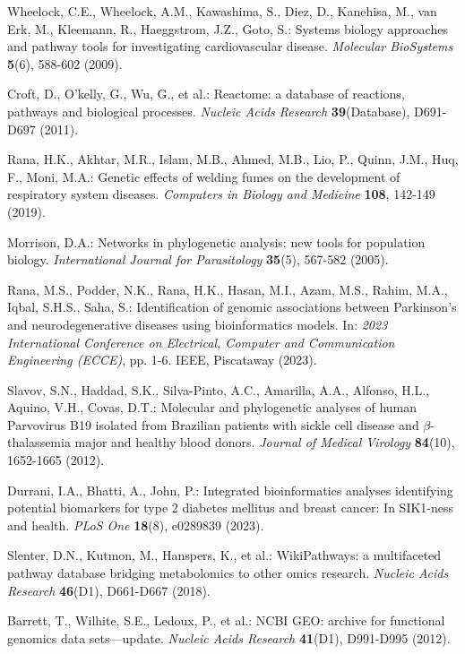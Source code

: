 \documentclass[a4paper,12pt,openbib,oneside]{memoir}
\theoremstyle{plain}
\theoremstyle{plain}
\theoremstyle{plain}
\theoremstyle{definition}
\theoremstyle{plain}
\theoremstyle{plain}
\theoremstyle{plain}
\begin{document}
\begin{thebibliography}{45}
Wheelock, C.E., Wheelock, A.M., Kawashima, S., Diez, D., Kanehisa, M., van Erk, M., Kleemann, R., Haeggstrom, J.Z., Goto, S.: Systems biology approaches and pathway tools for investigating cardiovascular disease. \emph{Molecular BioSystems} \textbf{5}(6), 588-602 (2009).

Croft, D., O'kelly, G., Wu, G., et al.: Reactome: a database of reactions, pathways and biological processes. \emph{Nucleic Acids Research} \textbf{39}(Database), D691-D697 (2011).

Rana, H.K., Akhtar, M.R., Islam, M.B., Ahmed, M.B., Lio, P., Quinn, J.M., Huq, F., Moni, M.A.: Genetic effects of welding fumes on the development of respiratory system diseases. \emph{Computers in Biology and Medicine} \textbf{108}, 142-149 (2019).

Morrison, D.A.: Networks in phylogenetic analysis: new tools for population biology. \emph{International Journal for Parasitology} \textbf{35}(5), 567-582 (2005).

Rana, M.S., Podder, N.K., Rana, H.K., Hasan, M.I., Azam, M.S., Rahim, M.A., Iqbal, S.H.S., Saha, S.: Identification of genomic associations between Parkinson's and neurodegenerative diseases using bioinformatics models. In: \emph{2023 International Conference on Electrical, Computer and Communication Engineering (ECCE)}, pp. 1-6. IEEE, Piscataway (2023).

Slavov, S.N., Haddad, S.K., Silva-Pinto, A.C., Amarilla, A.A., Alfonso, H.L., Aquino, V.H., Covas, D.T.: Molecular and phylogenetic analyses of human Parvovirus B19 isolated from Brazilian patients with sickle cell disease and $\beta$-thalassemia major and healthy blood donors. \emph{Journal of Medical Virology} \textbf{84}(10), 1652-1665 (2012).

Durrani, I.A., Bhatti, A., John, P.: Integrated bioinformatics analyses identifying potential biomarkers for type 2 diabetes mellitus and breast cancer: In SIK1-ness and health. \emph{PLoS One} \textbf{18}(8), e0289839 (2023).

Slenter, D.N., Kutmon, M., Hanspers, K., et al.: WikiPathways: a multifaceted pathway database bridging metabolomics to other omics research. \emph{Nucleic Acids Research} \textbf{46}(D1), D661-D667 (2018).

Barrett, T., Wilhite, S.E., Ledoux, P., et al.: NCBI GEO: archive for functional genomics data sets—update. \emph{Nucleic Acids Research} \textbf{41}(D1), D991-D995 (2012).


\end{thebibliography}
\end{document}

